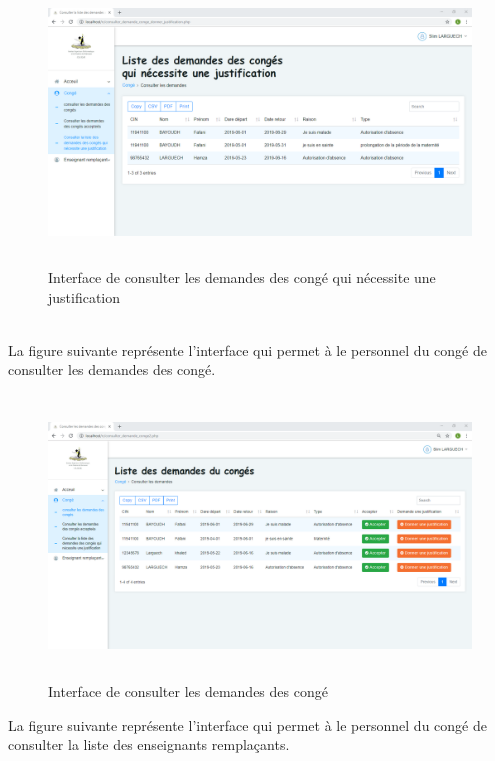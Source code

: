 \documentclass[12 pt ]{report}
\begin{document}
\begin{figure}[h]
 \begin{center}
\includegraphics[width= 18 cm ,height=7.5cm]{consulter_conge_dj.PNG}
\caption{Interface de consulter les demandes des  congé qui nécessite une justification  }

\end{center}
\end{figure} \\
La figure suivante représente l'interface qui permet à le personnel du congé de consulter les demandes des  congé.
\begin{figure}[h]
 \begin{center}
\includegraphics[width= 18 cm ,height=7.5cm]{consulter_demande_conge2.PNG}
\caption{Interface de consulter les demandes des  congé  }

\end{center}
\end{figure} 
\newpage
La figure suivante représente l'interface qui permet à le personnel du congé de consulter la liste des  enseignants remplaçants.
\end{document}
